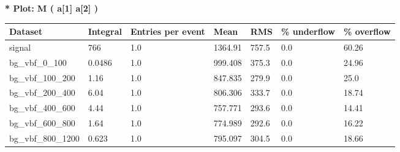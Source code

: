 \documentclass[a4paper, 10pt]{article}
\begin{document}
\textbf{* Plot: M ( a[1] a[2] ) }\\
   \begin{table}[H]
  \begin{center}
    \begin{tabular}{|m{23.0mm}|m{23.0mm}|m{18.0mm}|m{19.0mm}|m{19.0mm}|m{19.0mm}|m{19.0mm}|}
      \hline
      {\cellcolor{yellow}         Dataset}& {\cellcolor{yellow}         Integral}& {\cellcolor{yellow}         Entries per event}& {\cellcolor{yellow}         Mean}& {\cellcolor{yellow}         RMS}& {\cellcolor{yellow}         \% underflow}& {\cellcolor{yellow}         \% overflow}\\
      \hline
      {\cellcolor{white}         signal}& {\cellcolor{white}         766}& {\cellcolor{white}         1.0}& {\cellcolor{white}         1364.91}& {\cellcolor{white}         757.5}& {\cellcolor{red}         0.0}& {\cellcolor{red}         60.26}\\
      \hline
      {\cellcolor{white}         bg\_vbf\_0\_100}& {\cellcolor{white}         0.0486}& {\cellcolor{white}         1.0}& {\cellcolor{white}         999.408}& {\cellcolor{white}         375.3}& {\cellcolor{red}         0.0}& {\cellcolor{red}         24.96}\\
      \hline
      {\cellcolor{white}         bg\_vbf\_100\_200}& {\cellcolor{white}         1.16}& {\cellcolor{white}         1.0}& {\cellcolor{white}         847.835}& {\cellcolor{white}         279.9}& {\cellcolor{red}         0.0}& {\cellcolor{red}         25.0}\\
      \hline
      {\cellcolor{white}         bg\_vbf\_200\_400}& {\cellcolor{white}         6.04}& {\cellcolor{white}         1.0}& {\cellcolor{white}         806.306}& {\cellcolor{white}         333.7}& {\cellcolor{red}         0.0}& {\cellcolor{red}         18.74}\\
      \hline
      {\cellcolor{white}         bg\_vbf\_400\_600}& {\cellcolor{white}         4.44}& {\cellcolor{white}         1.0}& {\cellcolor{white}         757.771}& {\cellcolor{white}         293.6}& {\cellcolor{orange}         0.0}& {\cellcolor{orange}         14.41}\\
      \hline
      {\cellcolor{white}         bg\_vbf\_600\_800}& {\cellcolor{white}         1.64}& {\cellcolor{white}         1.0}& {\cellcolor{white}         774.989}& {\cellcolor{white}         292.6}& {\cellcolor{red}         0.0}& {\cellcolor{red}         16.22}\\
      \hline
      {\cellcolor{white}         bg\_vbf\_800\_1200}& {\cellcolor{white}         0.623}& {\cellcolor{white}         1.0}& {\cellcolor{white}         795.097}& {\cellcolor{white}         304.5}& {\cellcolor{red}         0.0}& {\cellcolor{red}         18.66}\\

\end{tabular}
\end{center}
\end{table}
\end{document}
